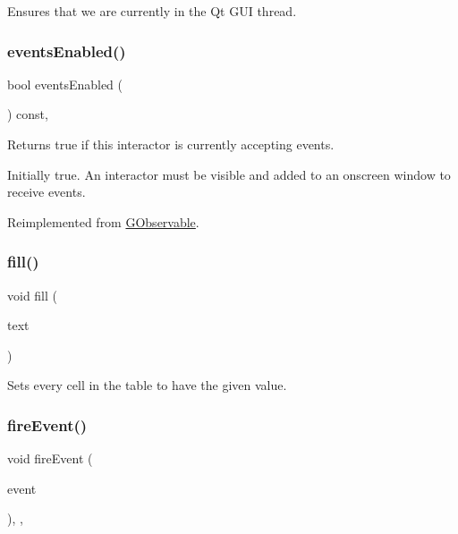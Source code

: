 Ensures that we are currently in the Qt G\+UI thread. 

\mbox{\label{classGInteractor_ac05ba5b92e2e5146d416fe7f842a0969}} 
\subsubsection{\texorpdfstring{events\+Enabled()}{eventsEnabled()}}
{\footnotesize\ttfamily bool events\+Enabled (\begin{DoxyParamCaption}{ }\end{DoxyParamCaption}) const\hspace{0.3cm}{\ttfamily [virtual]}, {\ttfamily [inherited]}}



Returns true if this interactor is currently accepting events. 

Initially true. An interactor must be visible and added to an onscreen window to receive events. 

Reimplemented from \mbox{\hyperlink{classGObservable_a8ebb3da91032e7f4c34485dabc518b8a}{G\+Observable}}.

\mbox{\label{classGTable_a1ff40d0915f96652929cfb739bdd969f}} 
\subsubsection{\texorpdfstring{fill()}{fill()}}
{\footnotesize\ttfamily void fill (\begin{DoxyParamCaption}\item[{const std\+::string \&}]{text }\end{DoxyParamCaption})\hspace{0.3cm}{\ttfamily [virtual]}}



Sets every cell in the table to have the given value. 

\mbox{\label{classGObservable_a63e5e5a6227c59c928493b11aceb0f67}} 
\subsubsection{\texorpdfstring{fire\+Event()}{fireEvent()}}
{\footnotesize\ttfamily void fire\+Event (\begin{DoxyParamCaption}\item[{\mbox{\hyperlink{classGEvent}{G\+Event}} \&}]{event }\end{DoxyParamCaption})\hspace{0.3cm}{\ttfamily [protected]}, {\ttfamily [virtual]}, {\ttfamily [inherited]}}



